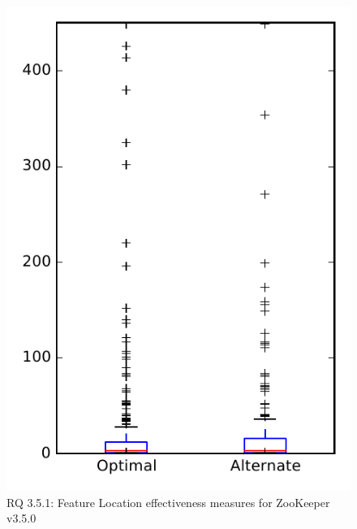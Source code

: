 
\begin{figure}
\centering
\includegraphics[height=0.4\textheight]{figures/combo/flt_rq1_zookeeper}
\caption{RQ 3.5.1: Feature Location effectiveness measures for ZooKeeper v3.5.0}
\label{fig:flt:rq1:zookeeper}
\end{figure}
